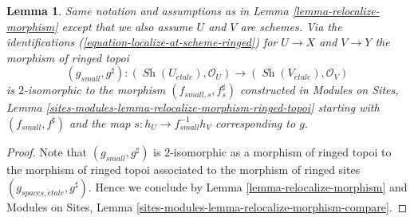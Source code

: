 \documentclass[10pt,a4paper]{amsart}
\theoremstyle{plain}
\newtheorem{lemma}[subsection]{Lemma}
\theoremstyle{definition}
\theoremstyle{remark}
\numberwithin{equation}{subsection}
\def\Sh{\mathop{\mathit{Sh}}\nolimits}
\def\etale{{\acute{e}tale}}
\begin{document}
\begin{lemma}
\label{lemma-relocalize-morphism-at-schemes}
Same notation and assumptions as in
Lemma \ref{lemma-relocalize-morphism}
except that we also assume $U$ and $V$ are schemes.
Via the identifications
(\ref{equation-localize-at-scheme-ringed})
for $U \to X$ and $V \to Y$ the morphism of ringed topoi
$$
(g_{small}, g^\sharp) :
(\Sh(U_\etale), \mathcal{O}_U)
\longrightarrow
(\Sh(V_\etale), \mathcal{O}_V)
$$
is $2$-isomorphic to the morphism $(f_{small, s}, f_s^\sharp)$
constructed in
Modules on Sites,
Lemma \ref{sites-modules-lemma-relocalize-morphism-ringed-topoi}
starting with $(f_{small}, f^\sharp)$ and
the map $s : h_U \to f_{small}^{-1}h_V$ corresponding to $g$.
\end{lemma}

\begin{proof}
Note that $(g_{small}, g^\sharp)$ is $2$-isomorphic as a
morphism of ringed topoi to the morphism of ringed topoi
associated to the morphism of ringed sites
$(g_{spaces, \etale}, g^\sharp)$. Hence we conclude by
Lemma \ref{lemma-relocalize-morphism}
and
Modules on Sites,
Lemma \ref{sites-modules-lemma-relocalize-morphism-compare}.
\end{proof}
\end{document}
